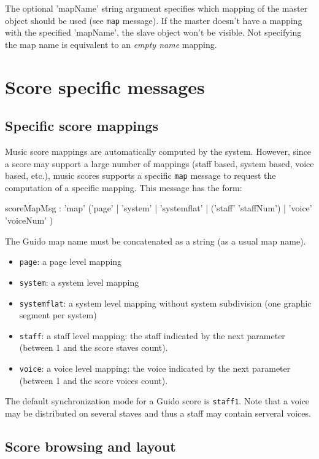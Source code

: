 \documentclass[a4paper,twoside]{report}
\newcommand{\toplevel}[1]	{\chapter{#1}}
\newcommand{\sublevel}[1]	{\section{#1}}
\newcommand{\OSC}[1]		{\texttt{#1}}
\begin{document}
The optional 'mapName' string argument specifies which mapping of the master object should be used (see \OSC{map} message). If the master doesn't have a mapping with the specified 'mapName', the slave object won't be visible.
Not specifying the map name is equivalent to an \emph{empty name} mapping.


\toplevel{Score specific messages}

\sublevel{Specific score mappings}
\label{guidomaps}

Music score mappings are automatically computed  by the system. However, since a score may support a large number of mappings (staff based, system based, voice based, etc.), music scores supports a specific \OSC{map} message to request the computation of a specific mapping. This message has the form:
\begin{rail}
scoreMapMsg : 'map' ('page' | 'system' | 'systemflat' | ('staff' 'staffNum') | 'voice' 'voiceNum' )
\end{rail}

The Guido map name must be concatenated as a string (as a usual map name).

\begin{itemize}
\item \OSC{page}: a page level mapping
\item \OSC{system}: a system level mapping
\item \OSC{systemflat}: a system level mapping without system subdivision (one graphic segment per system)
\item \OSC{staff}: a staff level mapping: the staff indicated by the next parameter (between 1 and the score staves count).
\item \OSC{voice}: a voice level mapping: the voice indicated by the next parameter (between 1 and the score voices count).
\end{itemize}


The default synchronization mode for a Guido score is \OSC{staff1}.
Note that a voice may be distributed on several staves and thus a staff may contain serveral voices.


\sublevel{Score browsing and layout}
\label{guidolayout}
\end{document}

